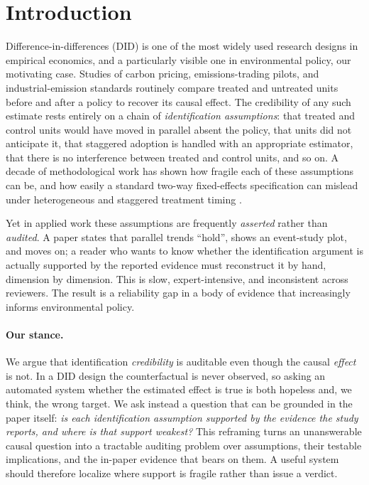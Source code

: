 \section{Introduction}
\label{sec:intro}

Difference-in-differences (DID) is one of the most widely used research designs in
empirical economics, and a particularly visible one in environmental policy, our
motivating case.
Studies of carbon pricing, emissions-trading pilots, and industrial-emission
standards routinely compare treated and untreated units before and after a
policy to recover its causal effect. The credibility of any
such estimate rests entirely on a chain of \emph{identification assumptions}:
that treated and control units would have moved in parallel absent the policy,
that units did not anticipate it, that staggered adoption is handled with an
appropriate estimator, that there is no interference between treated and control
units, and so on. A decade of methodological work has shown how fragile each of
these assumptions can be, and how easily a standard two-way fixed-effects
specification can mislead under heterogeneous and staggered treatment timing
\cite{goodmanbacon2021,callaway2021,sunabraham2021,dechaisemartin2020,roth2023}.

Yet in applied work these assumptions are frequently \emph{asserted} rather than
\emph{audited}. A paper states that parallel trends ``hold'', shows an
event-study plot, and moves on; a reader who wants to know whether the
identification argument is actually supported by the reported evidence must
reconstruct it by hand, dimension by dimension. This is slow, expert-intensive,
and inconsistent across reviewers. The result is a reliability gap in a body of
evidence that increasingly informs environmental policy.

\paragraph{Our stance.}
We argue that identification \emph{credibility} is auditable even though the
causal \emph{effect} is not. In a DID design the counterfactual is never
observed, so asking an automated system whether the estimated effect is true is
both hopeless and, we think, the wrong target. We ask instead a question that can
be grounded in the paper itself: \emph{is each identification assumption supported
by the evidence the study reports, and where is that support weakest?}
This reframing turns an unanswerable causal question into a tractable auditing
problem over assumptions, their testable implications, and the in-paper evidence
that bears on them. A useful system should therefore localize where support is
fragile rather than issue a verdict.

